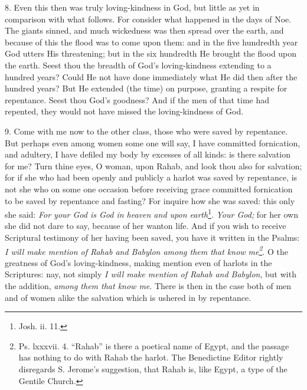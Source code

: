 8. Even this then was truly loving-kindness in God, but little as yet in comparison with what follows. For consider what happened in the days of Noe. The giants sinned, and much wickedness was then spread over the earth, and because of this the flood was to come upon them: and in the five hundredth year God utters His threatening; but in the six hundredth He brought the flood upon the earth. Seest thou the breadth of God’s loving-kindness extending to a hundred years? Could He not have done immediately what He did then after the hundred years? But He extended (the time) on purpose, granting a respite for repentance. Seest thou God’s goodness? And if the men of that time had repented, they would not have missed the loving-kindness of God.

9. Come with me now to the other class, those who were saved by repentance. But perhaps even among women some one will say, I have committed fornication, and adultery, I have defiled my body by excesses of all kinds: is there salvation for me? Turn thine eyes, O woman, upon Rahab, and look thou also for salvation; for if she who had been openly and publicly a harlot was saved by repentance, is not she who on some one occasion before receiving grace committed fornication to be saved by repentance and fasting? For inquire how she was saved: this only she said: \emph{For your God is God in heaven and upon earth}\footnote{Josh. ii. 11.}. \emph{Your God;} for her own she did not dare to say, because of her wanton life. And if you wish to receive Scriptural testimony of her having been saved, you have it written in the Psalms: \emph{I will make mention of Rahab and Babylon among them that know me\footnote{Ps. lxxxvii. 4. “Rahab” is there a poetical name of Egypt, and the passage has nothing to do with Rahab the harlot. The Benedictine Editor rightly disregards S. Jerome’s suggestion, that Rahab is, like Egypt, a type of the Gentile Church.}}. O the greatness of God’s loving-kindness, making mention even of harlots in the Scriptures: nay, not simply \emph{I will make mention of Rahab and Babylon}, but with the addition, \emph{among them that know me}. There is then in the case both of men and of women alike the salvation which is ushered in by repentance.


